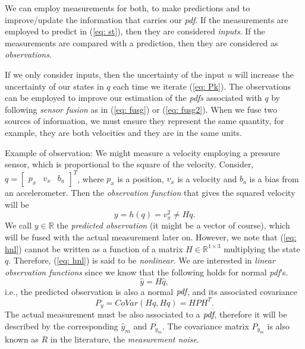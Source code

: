 \documentclass[11pt,a4paper]{article}
\begin{document}
We can employ measurements for both, to make predictions and to improve/update the information that carries our \emph{pdf}. If the measurements are employed to predict in (\ref{eq: st}), then they are considered \emph{inputs}. If the measurements are compared with a prediction, then they are considered as \emph{observations}.

If we only consider inputs, then the uncertainty of the input $u$ will increase the uncertainty of our states in $q$ each time we iterate (\ref{eq: Pk}). The observations can be employed to improve our estimation of the \emph{pdfs} associated with $q$ by following \emph{sensor fusion} as in (\ref{eq: fusg}) or (\ref{eq: fusg2}). When we fuse two sources of information, we must ensure they represent the same quantity, for example, they are both velocities and they are in the same units.

Example of observation: We might measure a velocity employing a pressure sensor, which is proportional to the square of the velocity. Consider, $q = \begin{bmatrix} p_x & v_x & b_a \end{bmatrix}^T$, where $p_x$ is a position, $v_x$ is a velocity and $b_a$ is a bias from an accelerometer. Then the \emph{observation function} that gives the squared velocity will be
\begin{equation}
y = h(q) = v_x^2 \neq H q.
\label{eq: hnl}
\end{equation}
We call $y\in\mathbb{R}$ the \emph{predicted observation} (it might be a vector of course), which will be fused with the actual measurement later on. However, we note that (\ref{eq: hnl}) cannot be written as a function of a matrix $H\in\mathbb{R}^{1\times 3}$ multiplying the state $q$. Therefore, (\ref{eq: hnl}) is said to be \emph{nonlinear}. We are interested in \emph{linear observation functions} since we know that the following holds for normal \emph{pdf}'s.
\begin{equation}
\hat y = H \hat q,
	\label{eq: hl}
\end{equation}
i.e., the predicted observation is also a normal $\emph{pdf}$, and its associated covariance
\begin{equation}
	P_y = CoVar(Hq, Hq) = HPH^T.
\end{equation}
The actual measurement must be also associated to a $\emph{pdf}$, therefore it will be described by the corresponding $\hat y_m$ and $P_{y_m}$. The covariance matrix $P_{y_m}$ is also known as $R$ in the literature, the \emph{measurement noise}.
\end{document}
